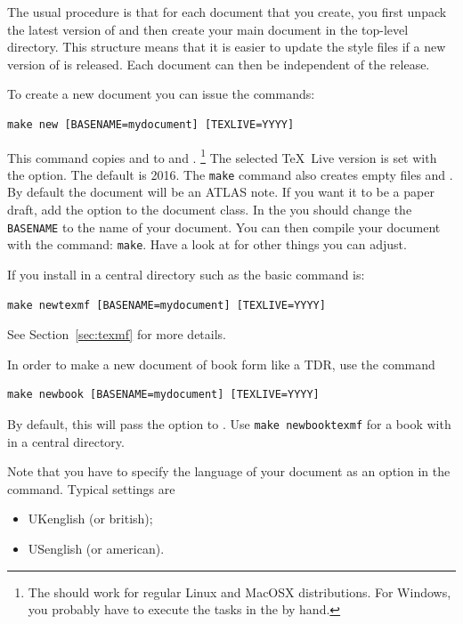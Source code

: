 The usual procedure is that for each document that you create,
you first unpack the latest version of  and
then create your main document in the top-level directory.
This structure means that it is easier to update the style files if a new version of
 is released. 
Each document can then be independent of the  release.

To create a new document you can issue the commands:
%
\begin{verbatim}
make new [BASENAME=mydocument] [TEXLIVE=YYYY]
\end{verbatim}
%
This command copies  and
to  and .%
\footnote{The  should work for regular Linux and MacOSX distributions.
  For Windows, you probably have to execute the tasks in the  by hand.}
The selected \TeX\ Live version is set with the  option. The default is 2016.
The \texttt{make} command also creates empty files  and .
By default the document will be an ATLAS note.
If you want it to be a paper draft, add the option  to the document class.
In the  you should change the \texttt{BASENAME} to the name of your document.
You can then compile your document with the command: \texttt{make}.
Have a look at  for other things you can adjust.

If you install  in a central directory such as  the basic command is:
%
\begin{verbatim}
make newtexmf [BASENAME=mydocument] [TEXLIVE=YYYY]
\end{verbatim}
%
See Section~\ref{sec:texmf} for more details.

In order to make a new document of book form like a TDR, use the command
%
\begin{verbatim}
make newbook [BASENAME=mydocument] [TEXLIVE=YYYY]
\end{verbatim}
%
By default, this will pass the option  to .
Use \verb|make newbooktexmf| for a book with  in a central directory.

Note that you have to specify the language of your document as an option in the
 command. Typical settings are
\begin{itemize}
\item UKenglish (or british);
\item USenglish (or american).
\end{itemize}

